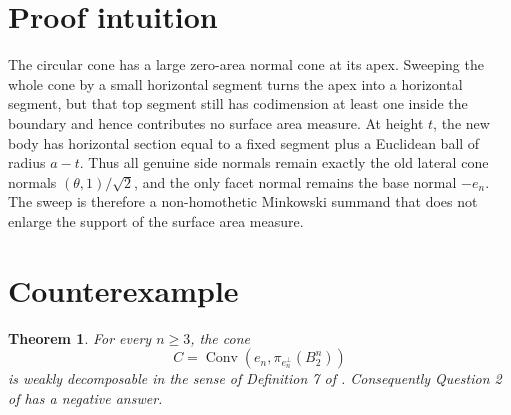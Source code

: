 \documentclass[11pt]{amsart}
\newtheorem{theorem}{Theorem}
\theoremstyle{remark}
\newcommand{\conv}{\operatorname{Conv}}
\begin{document}
\section*{Proof intuition}

The circular cone has a large zero-area normal cone at its apex. Sweeping the
whole cone by a small horizontal segment turns the apex into a horizontal
segment, but that top segment still has codimension at least one inside the
boundary and hence contributes no surface area measure. At height \(t\), the
new body has horizontal section equal to a fixed segment plus a Euclidean ball
of radius \(a-t\). Thus all genuine side normals remain exactly the old
lateral cone normals \((\theta,1)/\sqrt2\), and the only facet normal remains
the base normal \(-e_n\). The sweep is therefore a non-homothetic Minkowski
summand that does not enlarge the support of the surface area measure.

\section*{Counterexample}

\begin{theorem}
For every \(n\geq 3\), the cone
\[
        C=\conv(e_n,\pi_{e_n^\perp}(B_2^n))
\]
is weakly decomposable in the sense of Definition 7 of \cite{Szusterman2023}.
Consequently Question 2 of \cite{Szusterman2023} has a negative answer.
\end{theorem}
\end{document}
